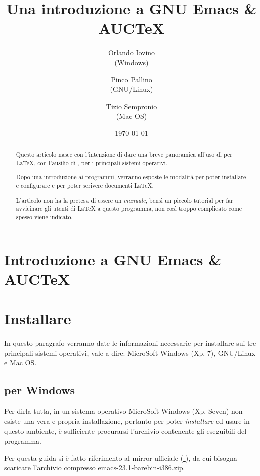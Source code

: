 \documentclass[10pt,a4paper]{article}
\title{Una introduzione a GNU Emacs \& AUC\TeX{}}
\author{Orlando Iovino\\(Windows)
  \and Pinco Pallino\\(GNU/Linux)
  \and Tizio Sempronio\\(Mac OS)}
\date{\today}
\begin{document}
 
\maketitle
\begin{abstract}\sffamily
Questo articolo nasce con l'intenzione di dare una breve panoramica
all'uso di \emacs{} per \LaTeX{}, con l'ausilio di \auctex, per i
principali sistemi operativi.

Dopo una introduzione ai programmi, verranno esposte le modalità per
poter installare e configurare \emacs{} e \auctex{} per poter scrivere
documenti \LaTeX{}.

L'articolo non ha la pretesa di essere un \emph{manuale}, bensì un
piccolo tutorial per far avvicinare gli utenti di \LaTeX{} a questo
programma, non così troppo complicato come spesso viene indicato.
\end{abstract}

\begin{multicols}{2}
  \tableofcontents
\end{multicols}

\section{Introduzione a GNU Emacs \& AUC\TeX}
\label{sec:intro}

\textcolor{red!50}{\lipsum[1]}

\section{Installare \emacs}
\label{sec:install}

In questo paragrafo verranno date le informazioni necessarie per installare
\emacs{} sui tre principali sistemi operativi, vale a dire: 
\textsf{MicroSoft Windows (Xp, 7)},
\textsf{GNU/Linux} e %
\textsf{Mac OS}.  %

\subsection*{\emacs{} per Windows}
\label{sec:installwin}
Per dirla tutta, in un sistema operativo MicroSoft Windows (Xp, Seven)
non esiste una vera e propria installazione, pertanto per poter
\emph{installare} ed usare \emacs{} in questo ambiente,
è sufficiente procurarsi l'archivio contenente gli eseguibili del programma.

Per questa guida si è fatto riferimento al mirror ufficiale
(\href{http://ftp.gnu.org/pub/gnu/emacs/windows/}{\mano{} \emacs}),
da cui bisogna scaricare l'archivio compresso
\href{http://ftp.gnu.org/pub/gnu/emacs/windows/emacs-23.1-barebin-i386.zip}
{\textsf{emacs-23.1-barebin-i386.zip}}.
\end{document}
